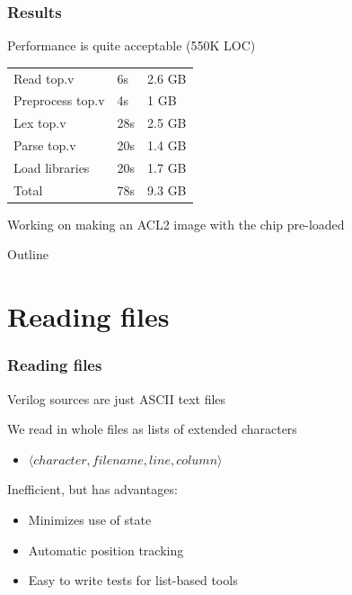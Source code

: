 \documentclass{beamer}
\newcommand{\Highlight}[1]{{\color{Highlight}#1}}
\newcommand{\SmallSkip}{\vspace{0.5cm}\noindent}
\begin{document}
\begin{frame}
\frametitle{Results}

Performance is quite acceptable (550K LOC)
\begin{center}
\begin{tabular}{lll}
Read top.v & 6s & 2.6 GB \\
Preprocess top.v & 4s & 1 GB \\
Lex top.v & 28s & 2.5 GB  \\
Parse top.v & 20s & 1.4 GB \\
Load libraries & 20s & 1.7 GB \\
\hline
Total & 78s & 9.3 GB
\end{tabular}
\end{center}

\SmallSkip
Working on making an ACL2 image with the chip pre-loaded

\end{frame}

\begin{frame}{Outline}
  \tableofcontents
\end{frame}


\section[Reading files]{Reading files}
\begin{frame}[fragile]
\frametitle{Reading files}

Verilog sources are just ASCII text files

\SmallSkip
We read in whole files as lists of \Highlight{extended characters}
\begin{itemize}
\item $\langle character, filename, line, column \rangle$
\end{itemize}

\SmallSkip
Inefficient, but has advantages:
\begin{itemize}
\item Minimizes use of state
\item Automatic position tracking
\item Easy to write tests for list-based tools
\end{itemize}

\end{frame}
\end{document}
